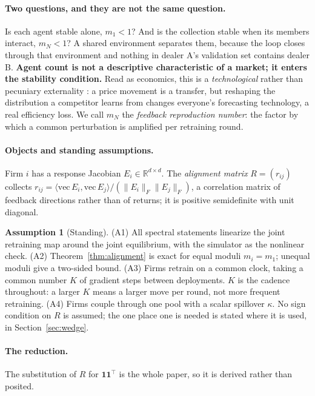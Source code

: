 \documentclass{article}
\theoremstyle{plain}
\theoremstyle{definition}
\newtheorem{assumption}{Assumption}
\newcommand{\mN}{m_N}
\begin{document}
\paragraph{Two questions, and they are not the same question.}
Is each agent stable alone, $m_1 < 1$? And is the collection stable when its members interact, $\mN < 1$? A shared environment separates them, because the loop closes through that environment and nothing in dealer A's validation set contains dealer B. \textbf{Agent count is not a descriptive characteristic of a market; it enters the stability condition.} Read as economics, this is a \emph{technological} rather than pecuniary externality \citep{buchanan1962}: a price movement is a transfer, but reshaping the distribution a competitor learns from changes everyone's forecasting technology, a real efficiency loss. We call $\mN$ the \emph{feedback reproduction number}: the factor by which a common perturbation is amplified per retraining round.

\paragraph{Objects and standing assumptions.}
Firm $i$ has a response Jacobian $E_i \in \mathbb{R}^{d\times d}$. The \emph{alignment matrix} $R = (r_{ij})$ collects $r_{ij} = \langle \mathrm{vec}\,E_i, \mathrm{vec}\,E_j\rangle / (\|E_i\|_F \|E_j\|_F)$, a correlation matrix of feedback directions rather than of returns; it is positive semidefinite with unit diagonal.

\begin{assumption}[Standing]
\label{ass:standing}
(A1) All spectral statements linearize the joint retraining map around the joint equilibrium, with the simulator as the nonlinear check. (A2) Theorem~\ref{thm:alignment} is exact for equal moduli $m_i = m_1$; unequal moduli give a two-sided bound. (A3) Firms retrain on a common clock, taking a common number $K$ of gradient steps between deployments. $K$ is the cadence throughout: a larger $K$ means a larger move per round, not more frequent retraining. (A4) Firms couple through one pool with a scalar spillover $\kappa$. No sign condition on $R$ is assumed; the one place one is needed is stated where it is used, in Section~\ref{sec:wedge}.
\end{assumption}

\paragraph{The reduction.}
The substitution of $R$ for $\mathbf{1}\mathbf{1}^{\top}$ is the whole paper, so it is derived rather than posited.
\end{document}
